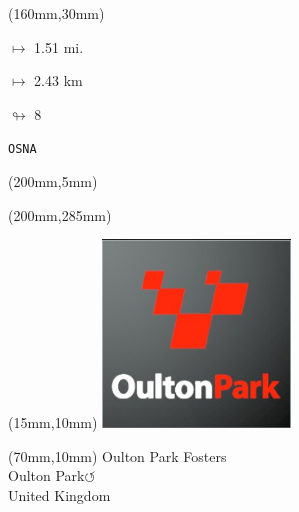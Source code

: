 \begin{textblock*}{40mm}(160mm,30mm)%
\Large
\par$\mapsto$ 1.51 mi.
\par$\mapsto$ 2.43 km
\par$\looparrowright$ 8
\par\hfill\tiny\tt OSNA\\
\end{textblock*}
\begin{textblock*}{20mm}(200mm,5mm)%
\fbox{\thepage}
\label{OSNA}
\end{textblock*}
\begin{textblock*}{20mm}(200mm,285mm)%
\fbox{\thepage}
\end{textblock*}

\null\newpage
\begin{textblock*}{50mm}(15mm,10mm)%
\includegraphics[width=50mm]{LG/2015-05-20_00091.png}
\end{textblock*}
\begin{textblock*}{130mm}(70mm,10mm)%
{\fontsize{20}{20}\selectfont Oulton Park Fosters\\}
{\fontsize{16}{16}\selectfont Oulton Park\hfill \huge$\circlearrowleft$\\}
{\fontsize{12}{12}\selectfont United Kingdom\\}
\end{textblock*}
